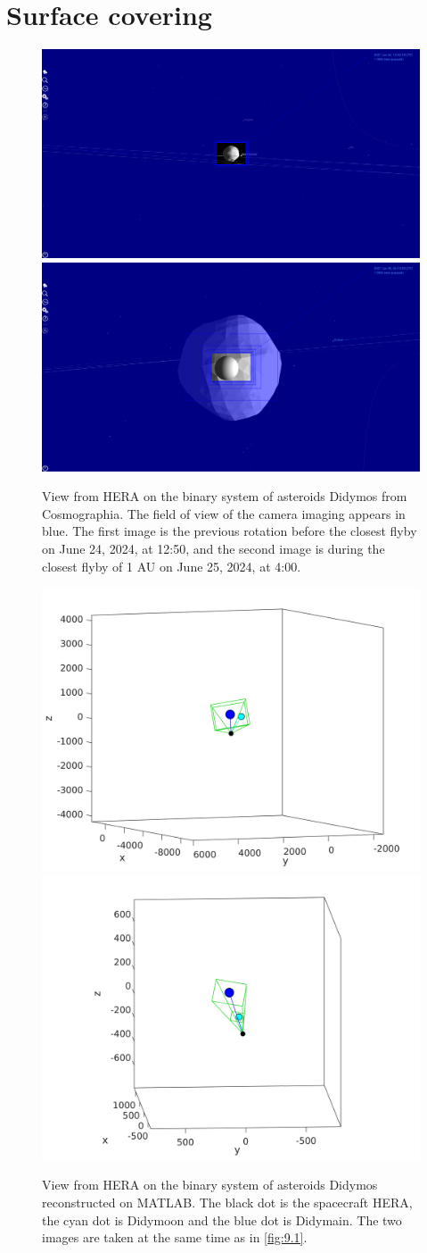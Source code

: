 \section{Surface covering}
\label{sec:9}

\begin{figure}[b]
    \centering
    \includegraphics[width=0.45\linewidth]{rsc/cosmo1.png}
    \includegraphics[width=0.45\linewidth]{rsc/cosmo2.png}
    \caption{View from HERA on the binary system of asteroids Didymos from Cosmographia. The field of view of the camera imaging appears in blue. The first image is the previous rotation before the closest flyby on June 24, 2024, at 12:50, and the second image is during the closest flyby of 1 \si{AU} on June 25, 2024, at 4:00.}
    \label{fig:9.1}
\end{figure}

\begin{figure}[t]
    \centering
    \includegraphics[width=0.49\linewidth]{rsc/cosmo-matlab1.png}
    \includegraphics[width=0.49\linewidth]{rsc/cosmo-matlab2.png}
    \caption{View from HERA on the binary system of asteroids Didymos reconstructed on MATLAB. The black dot is the spacecraft HERA, the cyan dot is Didymoon and the blue dot is Didymain. The two images are taken at the same time as in \autoref{fig:9.1}.}
    \label{fig:9.2}
\end{figure}

